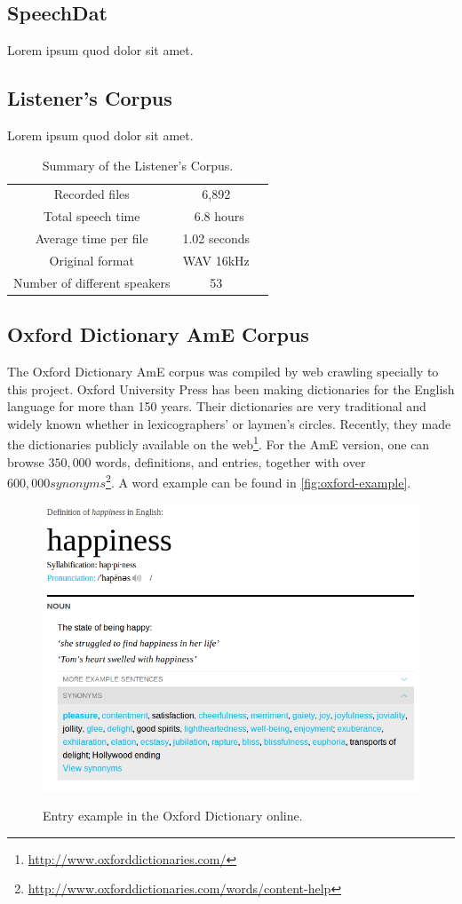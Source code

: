 \clearpage
\subsection{SpeechDat}
Lorem ipsum quod dolor sit amet.

\subsection{Listener's Corpus}
Lorem ipsum quod dolor sit amet.

\begin{table}[H]
\caption[Summary of Listener's Corpus.]{Summary of the Listener's Corpus.}
\smallskip
\centering
\begin{tabular}{ccc} \toprule
 Recorded files & 6,892 \\
 Total speech time & ~6.8 hours \\
 Average time per file & 1.02 seconds \\
 Original format & WAV 16kHz \\
 Number of different speakers & 53 \\
 \bottomrule
\end{tabular}
\end{table}

\clearpage
\subsection{Oxford Dictionary AmE Corpus}
The Oxford Dictionary \ac{AmE} corpus was compiled by web crawling specially to this project. Oxford University Press
has been making dictionaries for the English language for more than 150 years. Their dictionaries are very traditional and widely 
known whether in lexicographers' or laymen's circles. Recently, they made the dictionaries publicly available
on the web\footnote{\url{http://www.oxforddictionaries.com/}}. For the \ac{AmE} version, one can browse $350,000$ words, definitions, 
and entries, together with over $600,000 synonyms$\footnote{\url{http://www.oxforddictionaries.com/words/content-help}}.
A word example can be found in \autoref{fig:oxford-example}.

\begin{figure}[H]
 \myfloatalign
 {\includegraphics[width=.66\linewidth]{gfx/example-oxford-definition.png}}
 \caption{Entry example in the Oxford Dictionary online.}
 \label{fig:oxford-example}
\end{figure}

